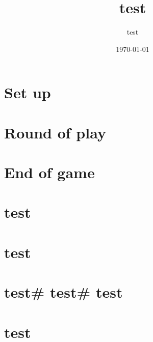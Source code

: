 \documentclass{article}%
\title{test}%
\author{test}%
\date{\today}%
\begin{document}
%
\normalsize%
\maketitle\thispagestyle{header}%
\pagestyle{header}%
\sectionfont{\color{blue}}%
\subsectionfont{\color{blue}}%
\subsubsectionfont{\color{blue}}%
\section{ Set up
}%
\label{sec:Setup}%

%
\sectionfont{\color{green}}%
\subsectionfont{\color{green}}%
\subsubsectionfont{\color{green}}%
\section{ Round of play
}%
\label{sec:Roundofplay}%

%
\sectionfont{\color{red}}%
\subsectionfont{\color{red}}%
\subsubsectionfont{\color{red}}%
\section{ End of game
}%
\label{sec:Endofgame}%

%
\sectionfont{\color{cyan}}%
\subsectionfont{\color{cyan}}%
\subsubsectionfont{\color{cyan}}%
\section{  test
}%
\label{sec:test}%

%
\sectionfont{\color{orange}}%
\subsectionfont{\color{orange}}%
\subsubsectionfont{\color{orange}}%
\section{  test
}%
\label{sec:test}%

%
\sectionfont{\color{purple}}%
\subsectionfont{\color{purple}}%
\subsubsectionfont{\color{purple}}%
\section{  test\#  test\#  test
}%
\label{sec:testtesttest}%

%
\sectionfont{\color{yellow}}%
\subsectionfont{\color{yellow}}%
\subsubsectionfont{\color{yellow}}%
\section{  test
}%
\label{sec:test}%
\end{document}
